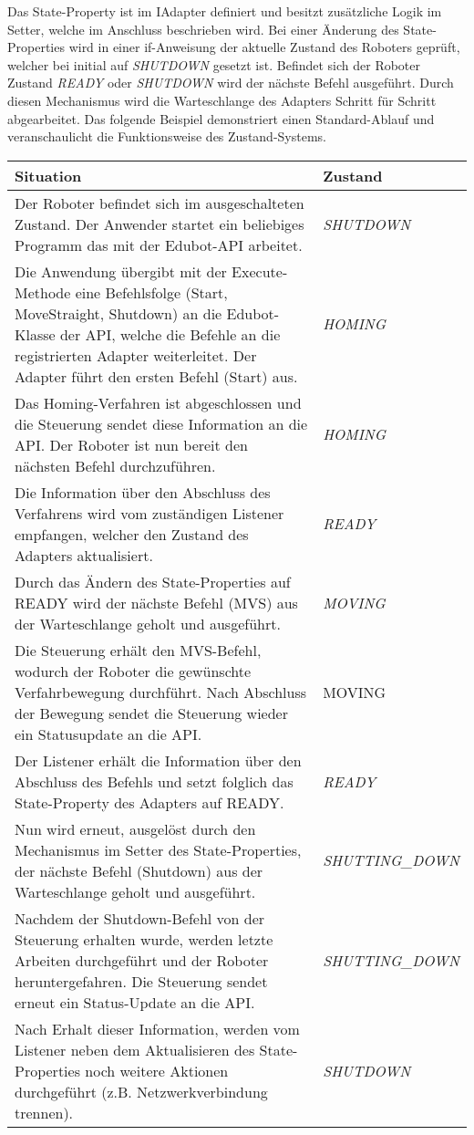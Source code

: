 \newline
\newline
Das State-Property ist im IAdapter definiert und besitzt zusätzliche Logik im Setter, welche im Anschluss beschrieben wird. Bei einer Änderung des State-Properties wird in einer if-Anweisung der aktuelle Zustand des Roboters geprüft, welcher bei initial auf \textit{SHUTDOWN} gesetzt ist. Befindet sich der Roboter Zustand \textit{READY} oder \textit{SHUTDOWN} wird der nächste Befehl ausgeführt. Durch diesen Mechanismus wird die Warteschlange des Adapters Schritt für Schritt abgearbeitet.
\newpage
Das folgende Beispiel demonstriert einen Standard-Ablauf und veranschaulicht die Funktionsweise des Zustand-Systems.
\newline
\newline
\begin{tabular}{|p{10cm}|p{4cm}|}
\hline \rowcolor{lightgray} \hline
\textbf{Situation} & \textbf{Zustand}\\
\hline
Der Roboter befindet sich im ausgeschalteten Zustand. Der Anwender startet ein beliebiges Programm das mit der Edubot-API arbeitet. & \textit{SHUTDOWN}\\
\hline
Die Anwendung übergibt mit der Execute-Methode eine Befehlsfolge (Start, MoveStraight, Shutdown) an die Edubot-Klasse der API, welche die Befehle an die registrierten Adapter weiterleitet. Der Adapter führt den ersten Befehl (Start) aus. & \textit{HOMING}\\
\hline
Das Homing-Verfahren ist abgeschlossen und die Steuerung sendet diese Information an die API. Der Roboter ist nun bereit den nächsten Befehl durchzuführen. & \textit{HOMING}\\
\hline
Die Information über den Abschluss des Verfahrens wird vom zuständigen Listener empfangen, welcher den Zustand des Adapters aktualisiert. & \textit{READY}\\
\hline
Durch das Ändern des State-Properties auf READY wird der nächste Befehl (MVS) aus der Warteschlange geholt und ausgeführt. & \textit{MOVING}\\
\hline
Die Steuerung erhält den MVS-Befehl, wodurch der Roboter die gewünschte Verfahrbewegung durchführt. Nach Abschluss der Bewegung sendet die Steuerung wieder ein Statusupdate an die API.	 & MOVING\\
\hline
Der Listener erhält die Information über den Abschluss des Befehls und setzt folglich das State-Property des Adapters auf READY. & \textit{READY}\\
\hline
Nun wird erneut, ausgelöst durch den Mechanismus im Setter des State-Properties, der nächste Befehl (Shutdown) aus der Warteschlange geholt und ausgeführt. & \textit{SHUTTING\_DOWN}\\
\hline
Nachdem der Shutdown-Befehl von der Steuerung erhalten wurde, werden letzte Arbeiten durchgeführt und der Roboter heruntergefahren. Die Steuerung sendet erneut ein Status-Update an die API. & \textit{SHUTTING\_DOWN}\\
\hline
Nach Erhalt dieser Information, werden vom Listener neben dem Aktualisieren des State-Properties noch weitere Aktionen durchgeführt (z.B. Netzwerkverbindung trennen). & \textit{SHUTDOWN}\\
\hline
\end{tabular}